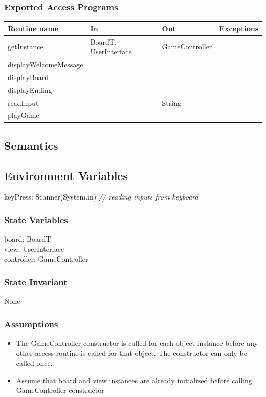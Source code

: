 \documentclass[12pt]{article}
\begin{document}
\subsubsection* {Exported Access Programs}
\begin{tabular}{| l | l | l | l |}
\hline
\textbf{Routine name} & \textbf{In} & \textbf{Out} & \textbf{Exceptions}\\
\hline
getInstance & BoardT, UserInterface & GameController & \\
\hline
displayWelcomeMessage &  &  & \\
\hline
displayBoard &  &  & \\
\hline
displayEnding &  &  & \\
\hline
readInput &  & String & \\
\hline
playGame &  &  & \\
\hline
\end{tabular}

\subsection* {Semantics}

\subsection*{Environment Variables}
keyPress: Scanner(System.in) \qquad \textit{// reading inputs from keyboard}

\subsubsection* {State Variables}
board: BoardT \\
view: UserInterface \\
controller: GameController

\subsubsection* {State Invariant}
None

\subsubsection* {Assumptions}
\begin{itemize}
  \item The GameController constructor is called for each object instance before any
  other access routine is called for that object.  The constructor can only be
  called once.
  \item Assume that board and view instances are already initialized before calling GameController
        constructor
\end{itemize}
\end{document}
